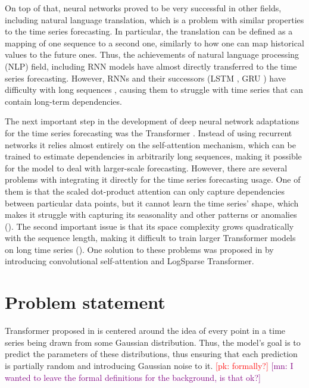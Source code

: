 \documentclass[en]{pracamgr}
\newcommand{\pk}[1]{\textcolor{red}{\small [pk: #1]}}
\newcommand{\mn}[1]{\textcolor{purple}{\small [mn: #1]}}
\begin{document}
On top of that, neural networks proved to be very successful in other fields, including natural language translation, which is a problem with similar properties to the time series forecasting. In particular, the translation can be defined as a mapping of one sequence to a second one, similarly to how one can map historical values to the future ones. Thus, the achievements of natural language processing (NLP) field, including RNN models have almost directly transferred to the time series forecasting. However, RNNs and their successors (LSTM \cite{lstm}, GRU \cite{gru}) have difficulty with long sequences \cite{context}, causing them to struggle with time series that can contain long-term dependencies.

The next important step in the development of deep neural network adaptations for the time series forecasting was the Transformer \cite{tr}. Instead of using recurrent networks it relies almost entirely on the self-attention mechanism, which can be trained to estimate dependencies in arbitrarily long sequences, making it possible for the model to deal with larger-scale forecasting.
However, there are several problems with integrating it directly for the time series forecasting usage. One of them is that the scaled dot-product attention can only capture dependencies between particular data points, but it cannot learn the time series' shape, which makes it struggle with capturing its seasonality and other patterns or anomalies (\cite{enhancing}). The second important issue is that its space complexity grows quadratically with the sequence length, making it difficult to train larger Transformer models on long time series (\cite{enhancing}).
One solution to these problems was proposed in \cite{enhancing} by introducing convolutional self-attention and LogSparse Transformer.





%

\section{Problem statement}\label{r:problemst}

Transformer proposed in \cite{enhancing} is centered around the idea of every point in a time series being drawn from some Gaussian distribution. Thus, the model's goal is to predict the parameters of these distributions, thus ensuring that each prediction is partially random and introducing Gaussian noise to it. \pk{formally?} \mn{I wanted to leave the formal definitions for the background, is that ok?}
\end{document}
